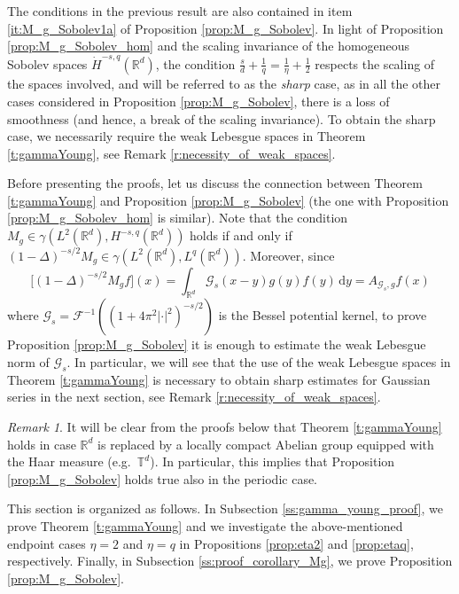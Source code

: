\documentclass[reqno]{amsart}
\theoremstyle{plain}
\theoremstyle{remark}
\newtheorem{remark}[theorem]{Remark}
\theoremstyle{plain}
\numberwithin{equation}{section}
\newcommand\cG{\mathscr{G}}
\def\R{{\mathbb R}}
\newcommand{\g}{\gamma}
\newcommand{\T}{\mathbb{T}}
\newcommand{\di}{\mathrm{d}}
\newcommand{\1}{\one}
\begin{document}
The conditions in the previous result are also contained in item \eqref{it:M_g_Sobolev1a} of Proposition \ref{prop:M_g_Sobolev}. In light of Proposition \ref{prop:M_g_Sobolev_hom} and the scaling invariance of the homogeneous Sobolev spaces $\dot{H}^{-s,q}(\R^d)$, the condition $\frac{s}{d}+\frac{1}{q}= \frac{1}{\eta}+\frac{1}{2}$
respects the scaling of the spaces involved, and will be referred to as the \emph{sharp} case, as in all the other cases considered in Proposition \ref{prop:M_g_Sobolev}, there is a loss of smoothness (and hence, a break of the scaling invariance). To obtain the sharp case, we necessarily require the weak Lebesgue spaces in Theorem \ref{t:gammaYoung}, see Remark \ref{r:necessity_of_weak_spaces}.

\smallskip


Before presenting the proofs, let us discuss the connection between Theorem \ref{t:gammaYoung} and Proposition \ref{prop:M_g_Sobolev} (the one with Proposition \ref{prop:M_g_Sobolev_hom} is similar). Note that the condition $M_g\in \g(L^2(\R^d),H^{-s,q}(\R^d))$ holds if and only if $(1-\Delta)^{-s/2} M_g \in \g(L^2(\R^d),L^q(\R^d))$. Moreover, since 
\begin{equation}
\label{eq:delta_Bessel_potential_kernel}
\big[(1-\Delta)^{-s/2} M_g f\big](x)= \int_{\R^d} \mathscr{G}_s(x-y) g(y)f (y)\,\di y = A_{\mathscr{G}_s,g}f(x)
\end{equation}
where $\mathscr{G}_s=\mathscr{F}^{-1} ((1+4\pi^2|\cdot|^2)^{-s/2})$ is the Bessel potential kernel, to prove Proposition \ref{prop:M_g_Sobolev} it is enough to estimate the weak Lebesgue norm of $\cG_s$. In particular, we will see that the use of the weak Lebesgue spaces in Theorem \ref{t:gammaYoung} is necessary to obtain sharp estimates for Gaussian series in the next section, see Remark \ref{r:necessity_of_weak_spaces}. 

\begin{remark}\label{rem:groups}
It will be clear from the proofs below that Theorem \ref{t:gammaYoung} holds in case $\R^d$ is replaced by a locally compact Abelian group equipped with the Haar measure (e.g.\ $\T^d$).  
In particular, this implies that Proposition \ref{prop:M_g_Sobolev} holds true also in the periodic case.  
\end{remark}

This section is organized as follows. In Subsection \ref{ss:gamma_young_proof}, we prove Theorem \ref{t:gammaYoung} and we investigate the above-mentioned endpoint cases $\eta=2$ and $\eta=q$ in Propositions \ref{prop:eta2} and \ref{prop:etaq}, respectively. Finally, in Subsection \ref{ss:proof_corollary_Mg}, we prove Proposition \ref{prop:M_g_Sobolev}.
\end{document}
